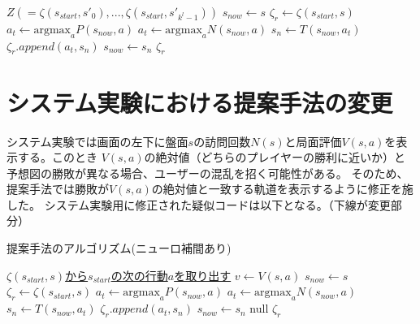 \begin{algorithm}
\begin{algorithmic}[1]
                \EndFor     
           \EndWhile
           \Return $Z(={\zeta(s_{start}, {s'}_0), ..., \zeta(s_{start}, {s'}_{k^l-1})})$
        \EndFunction
        \State $s_{now} \gets s$
        \State $\zeta_r \gets \zeta(s_{start}, s)$
                \State \underline{$a_t \gets \textrm{argmax}_a P(s_{now}, a)$}
            \Else
                \State $a_t \gets \textrm{argmax}_a N(s_{now}, a)$
            \EndIf
            \State $s_n \gets T(s_{now}, a_t)$
            \State $\zeta_r.append({a_t, s_n})$
            \State $s_{now} \gets s_n$
        \EndWhile
        \Return $\zeta_r$
        \EndFunction
       
        
    \end{algorithmic}
\end{algorithm}
\section{システム実験における提案手法の変更}
システム実験では画面の左下に盤面$s$の訪問回数$N(s)$と局面評価$V(s, a)$を表示する。このとき
$V(s, a)$の絶対値（どちらのプレイヤーの勝利に近いか）と予想図の勝敗が異なる場合、ユーザーの混乱を招く可能性がある。
そのため、提案手法では勝敗が$V(s, a)$の絶対値と一致する軌道を表示するように修正を施した。
システム実験用に修正された疑似コードは以下となる。（下線が変更部分）
\begin{algorithm}
    \caption{提案手法のアルゴリズム(ニューロ補間あり)}
    \begin{algorithmic}[1]       
        
        \state  \underline{$\zeta(s_{start}, s)$から$s_{start}$の次の行動$a$を取り出す}
        \state \underline{$v \gets V(s, a)$}
        \State $s_{now} \gets s$
        \State $\zeta_r \gets \zeta(s_{start}, s)$
                \State \underline{$a_t \gets \textrm{argmax}_a P(s_{now}, a)$}
            \Else
                \State $a_t \gets \textrm{argmax}_a N(s_{now}, a)$
            \EndIf
            \State $s_n \gets T(s_{now}, a_t)$
            \State $\zeta_r.append({a_t, s_n})$
            \State $s_{now} \gets s_n$
        \EndWhile
           \Return null
        \EndIf
        \Return $\zeta_r$
        \EndFunction
       
        
    \end{algorithmic}
\end{algorithm}
